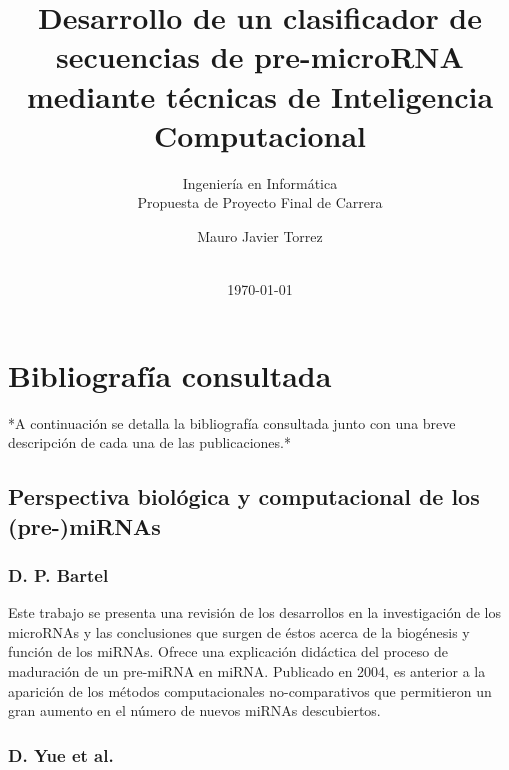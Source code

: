 \documentclass[12pt,bibliography=oldstyle,DIV=12,parskip=half-]{scrartcl}
\begin{document}
%
\begin{titlepage}
%
\titlehead{\center Universidad Nacional del Litoral\\
  Facultad de Ingeniería y Ciencias Hídricas}
%
\subtitle{Ingeniería en Informática\\
  Propuesta de Proyecto Final de Carrera}
%
\title{Desarrollo de un clasificador de secuencias de pre-microRNA
  mediante técnicas de Inteligencia Computacional}
\subject{Informe entregable 1}
\author{Mauro Javier Torrez}
%
\publishers{\-\\[4em]{Director\\Dr. Diego H. Milone}\\[2em]
  {Asesora temática\\Dra. Georgina S. Stegmayer}}
%
\date{\-\\[2em]\today}
%
\renewcommand*{\titlepagestyle}{empty}
\maketitle
\end{titlepage}
\setcounter{page}{1}
%
%
%
%
\section{Bibliografía consultada}
%
*A continuación se detalla la bibliografía consultada junto con una
breve descripción de cada una de las publicaciones.*
%
\subsection{Perspectiva biológica y computacional de los (pre-)miRNAs}
\subsubsection*{D. P. Bartel \cite{bartel116}}
Este trabajo se presenta una revisión de los desarrollos en la
investigación de los microRNAs y las conclusiones que surgen de éstos
acerca de la biogénesis y función de los miRNAs.  Ofrece una
explicación didáctica del proceso de maduración de un pre-miRNA en
miRNA.  Publicado en 2004, es anterior a la aparición de los métodos
computacionales no-comparativos que permitieron un gran aumento en el
número de nuevos miRNAs descubiertos.
%
\subsubsection*{D. Yue et al. \cite{yue}}
%
\end{document}

